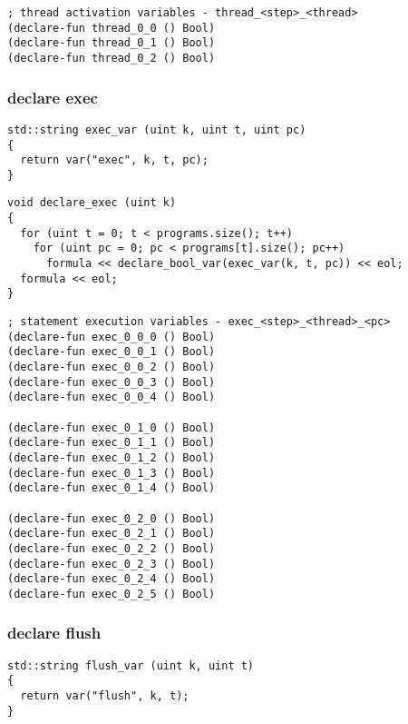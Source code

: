 \begin{lstlisting}[language=SMTLib]
; thread activation variables - thread_<step>_<thread>
(declare-fun thread_0_0 () Bool)
(declare-fun thread_0_1 () Bool)
(declare-fun thread_0_2 () Bool)
\end{lstlisting}

\subsubsection{declare exec}

\begin{lstlisting}[style=c++]
std::string exec_var (uint k, uint t, uint pc)
{
  return var("exec", k, t, pc);
}
\end{lstlisting}

\begin{lstlisting}[style=c++]
void declare_exec (uint k)
{
  for (uint t = 0; t < programs.size(); t++)
    for (uint pc = 0; pc < programs[t].size(); pc++)
      formula << declare_bool_var(exec_var(k, t, pc)) << eol;
  formula << eol;
}
\end{lstlisting}

\begin{lstlisting}[language=SMTLib]
; statement execution variables - exec_<step>_<thread>_<pc>
(declare-fun exec_0_0_0 () Bool)
(declare-fun exec_0_0_1 () Bool)
(declare-fun exec_0_0_2 () Bool)
(declare-fun exec_0_0_3 () Bool)
(declare-fun exec_0_0_4 () Bool)

(declare-fun exec_0_1_0 () Bool)
(declare-fun exec_0_1_1 () Bool)
(declare-fun exec_0_1_2 () Bool)
(declare-fun exec_0_1_3 () Bool)
(declare-fun exec_0_1_4 () Bool)

(declare-fun exec_0_2_0 () Bool)
(declare-fun exec_0_2_1 () Bool)
(declare-fun exec_0_2_2 () Bool)
(declare-fun exec_0_2_3 () Bool)
(declare-fun exec_0_2_4 () Bool)
(declare-fun exec_0_2_5 () Bool)
\end{lstlisting}

\subsubsection{declare flush}

\begin{lstlisting}[style=c++]
std::string flush_var (uint k, uint t)
{
  return var("flush", k, t);
}
\end{lstlisting}

